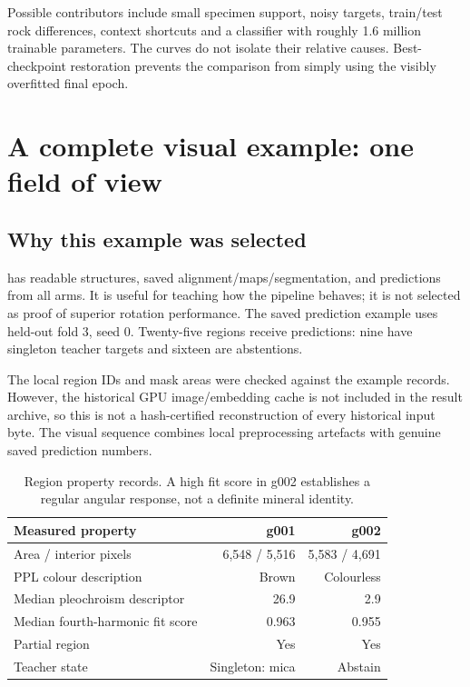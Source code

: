 Possible contributors include small specimen support, noisy targets, train/test rock differences, context shortcuts and a classifier with roughly 1.6 million trainable parameters. The curves do not isolate their relative causes. Best-checkpoint restoration prevents the comparison from simply using the visibly overfitted final epoch.
\FloatBarrier

\clearpage
\section{A complete visual example: one field of view}
\subsection{Why this example was selected}
 has readable structures, saved alignment/maps/segmentation, and predictions from all arms. It is useful for teaching how the pipeline behaves; it is not selected as proof of superior rotation performance. The saved prediction example uses held-out fold 3, seed 0. Twenty-five regions receive predictions: nine have singleton teacher targets and sixteen are abstentions.

The local region IDs and mask areas were checked against the example records. However, the historical GPU image/embedding cache is not included in the result archive, so this is not a hash-certified reconstruction of every historical input byte. The visual sequence combines local preprocessing artefacts with genuine saved prediction numbers.

\begin{table}[H]\centering
\begin{tabular}{@{}lrr@{}}\toprule Measured property & g001 & g002\\\midrule
Area / interior pixels & 6,548 / 5,516 & 5,583 / 4,691\\
PPL colour description & Brown & Colourless\\
Median pleochroism descriptor & 26.9 & 2.9\\
Median fourth-harmonic fit score & 0.963 & 0.955\\
Partial region & Yes & Yes\\
Teacher state & Singleton: mica & Abstain\\\bottomrule
\end{tabular}
\caption{Region property records. A high fit score in g002 establishes a regular angular response, not a definite mineral identity.}
\end{table}

